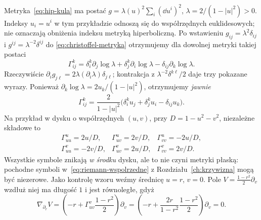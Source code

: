 \begin{przyklad}
\label{prz:christoffel-dysk}
Metryka~\eqref{eq:hip-kula} ma postać
$g=\lambda(u)^2\sum_i(\dd u^i)^2$,
$\lambda=2/(1-|u|^2)>0$. Indeksy $u_i=u^i$ w tym
przykładzie odnoszą się do współrzędnych euklidesowych;
nie oznaczają obniżenia indeksu metryką hiperboliczną.
Po wstawieniu
$g_{ij}=\lambda^2\delta_{ij}$ i
$g^{ij}=\lambda^{-2}\delta^{ij}$ do
\eqref{eq:christoffel-metryka} otrzymujemy
dla dowolnej metryki takiej postaci
\begin{equation}\label{eq:gamma-konforemne}
 \Gamma^k_{ij}=\delta^k_i\partial_j\log\lambda
 +\delta^k_j\partial_i\log\lambda
 -\delta_{ij}\partial_k\log\lambda.
\end{equation}
Rzeczywiście $\partial_i g_{j\ell}
=2\lambda(\partial_i\lambda)\delta_{j\ell}$;
kontrakcja z $\lambda^{-2}\delta^{k\ell}/2$
daje trzy pokazane wyrazy. Ponieważ
$\partial_k\log\lambda=2u_k/(1-|u|^2)$,
otrzymujemy \emph{jawnie}
\begin{equation}\label{eq:gamma-dysk}
 \boxed{\displaystyle
 \Gamma^k_{ij}=\frac{2}{1-|u|^2}
   \bigl(\delta^k_i u_j+\delta^k_j u_i
                          -\delta_{ij}u_k\bigr).}
\end{equation}
Na przykład w dysku o współrzędnych $(u,v)$,
przy $D=1-u^2-v^2$, niezależne składowe to
\[
 \begin{array}{lll}
 \Gamma^u_{uu}=2u/D,&\Gamma^u_{uv}=2v/D,&
 \Gamma^u_{vv}=-2u/D,\\
 \Gamma^v_{uu}=-2v/D,&\Gamma^v_{uv}=2u/D,&
 \Gamma^v_{vv}=2v/D.
 \end{array}
\]
Wszystkie symbole znikają \emph{w środku} dysku,
ale to nie czyni metryki płaską: pochodne symboli
w~\eqref{eq:riemann-wspolrzedne} z
Rozdziału~\ref{ch:krzywizna} mogą być niezerowe.
Jako kontrolę wzoru weźmy średnicę $u=r$, $v=0$.
Pole $V=\frac{1-r^2}{2}\partial_v$ wzdłuż niej
ma długość $1$ i jest równoległe, gdyż
\[
 \nabla_{\partial_r}V
 =\left(-r+\Gamma^v_{uv}\frac{1-r^2}{2}\right)
             \partial_v
 =\left(-r+\frac{2r}{1-r^2}\frac{1-r^2}{2}\right)
             \partial_v=0.
\]
\end{przyklad}

